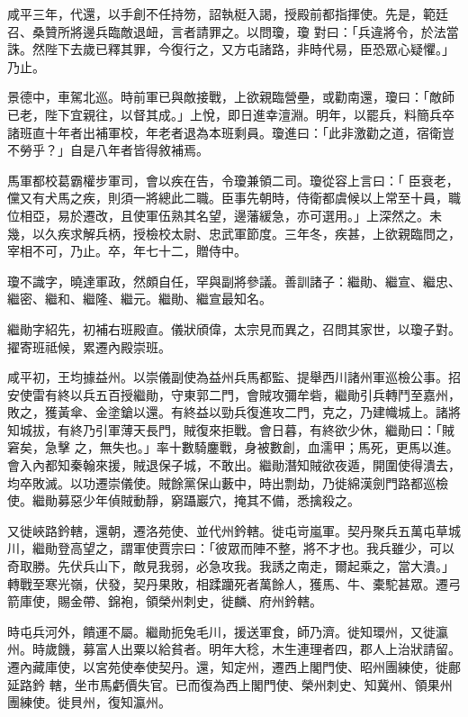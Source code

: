 \begin{pinyinscope}
 咸平三年，代還，以手創不任持笏，詔執梃入謁，授殿前都指揮使。先是，範廷召、桑贊所將邊兵臨敵退衄，言者請罪之。以問瓊，瓊
 對曰：「兵違將令，於法當誅。然陛下去歲已釋其罪，今復行之，又方屯諸路，非時代易，臣恐眾心疑懼。」乃止。



 景德中，車駕北巡。時前軍已與敵接戰，上欲親臨營壘，或勸南還，瓊曰：「敵師已老，陛下宜親往，以督其成。」上悅，即日進幸澶淵。明年，以罷兵，料簡兵卒諸班直十年者出補軍校，年老者退為本班剩員。瓊進曰：「此非激勸之道，宿衛豈不勞乎？」自是八年者皆得敘補焉。



 馬軍都校葛霸權步軍司，會以疾在告，令瓊兼領二司。瓊從容上言曰：「
 臣衰老，儻又有犬馬之疾，則須一將總此二職。臣事先朝時，侍衛都虞候以上常至十員，職位相亞，易於遷改，且使軍伍熟其名望，邊藩緩急，亦可選用。」上深然之。未幾，以久疾求解兵柄，授檢校太尉、忠武軍節度。三年冬，疾甚，上欲親臨問之，宰相不可，乃止。卒，年七十二，贈侍中。



 瓊不識字，曉達軍政，然頗自任，罕與副將參議。善訓諸子：繼勛、繼宣、繼忠、繼密、繼和、繼隆、繼元。繼勛、繼宣最知名。



 繼勛字紹先，初補右班殿直。儀狀頎偉，太宗見而異之，召問其家世，以瓊子對。擢寄班祗候，累遷內殿崇班。



 咸平初，王均據益州。以崇儀副使為益州兵馬都監、提舉西川諸州軍巡檢公事。招安使雷有終以兵五百授繼勛，守東郭二門，會賊攻彌牟砦，繼勛引兵轉鬥至嘉州，敗之，獲黃傘、金塗鎗以還。有終益以勁兵復進攻二門，克之，乃建幟城上。諸將知城拔，有終乃引軍薄天長門，賊復來拒戰。會日暮，有終欲少休，繼勛曰：「賊窘矣，急擊
 之，無失也。」率十數騎鏖戰，身被數創，血濡甲；馬死，更馬以進。會入內都知秦翰來援，賊退保子城，不敢出。繼勛潛知賊欲夜遁，開圍使得潰去，均卒敗滅。以功遷崇儀使。賊餘黨保山藪中，時出剽劫，乃徙綿漢劍門路都巡檢使。繼勛募惡少年偵賊動靜，窮躡巖穴，掩其不備，悉擒殺之。



 又徙峽路鈐轄，還朝，遷洛苑使、並代州鈐轄。徙屯岢嵐軍。契丹聚兵五萬屯草城川，繼勛登高望之，謂軍使賈宗曰：「彼眾而陣不整，將不才也。我兵雖少，可以
 奇取勝。先伏兵山下，敵見我弱，必急攻我。我誘之南走，爾起乘之，當大潰。」轉戰至寒光嶺，伏發，契丹果敗，相蹂躪死者萬餘人，獲馬、牛、橐駝甚眾。遷弓箭庫使，賜金帶、錦袍，領榮州刺史，徙麟、府州鈐轄。



 時屯兵河外，饋運不屬。繼勛扼兔毛川，援送軍食，師乃濟。徙知環州，又徙瀛州。時歲饑，募富人出粟以給貧者。明年大稔，木生連理者四，郡人上治狀請留。遷內藏庫使，以宮苑使奉使契丹。還，知定州，遷西上閣門使、昭州團練使，徙鄜延路鈐
 轄，坐市馬虧價失官。已而復為西上閣門使、榮州刺史、知冀州、領果州團練使。徙貝州，復知瀛州。




\end{pinyinscope}
